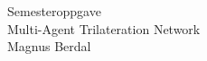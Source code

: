 \documentclass[a4paper]{article}
\begin{document}
\begin{titlepage}
\begin{center}
\Large Semesteroppgave\\
\vspace{10pt}
\Large Multi-Agent Trilateration Network\\
\vspace{10pt}
\large Magnus Berdal
\end{center}
\end{titlepage}

\clearpage
\tableofcontents











\end{document}
